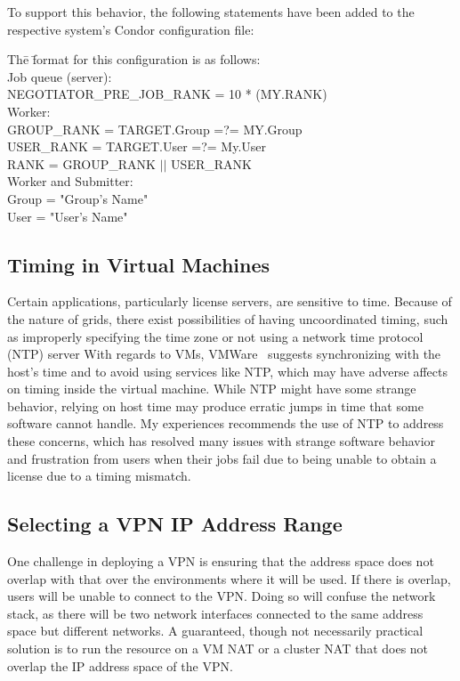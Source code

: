 To support this behavior, the following statements have been added to the
respective system's Condor configuration file:

\begin{tabbing}
Th\=e \=format for this configuration is as follows:\\
\> Job queue (server):\\
\> \> NEGOTIATOR\_PRE\_JOB\_RANK = 10 * (MY.RANK) \\
\> Worker:\\
\> \> GROUP\_RANK = TARGET.Group =?= MY.Group \\
\> \> USER\_RANK = TARGET.User =?= My.User \\
\> \> RANK = GROUP\_RANK $\vert\vert$ USER\_RANK \\
\>  Worker and Submitter:\\
\> \> Group = "Group's Name"\\
\> \> User = "User's Name"
\end{tabbing}

\subsection{Timing in Virtual Machines}

Certain applications, particularly license servers, are sensitive to time.
Because of the nature of grids, there exist possibilities of having
uncoordinated timing, such as improperly specifying the time zone or not using
a network time protocol (NTP) server With regards to VMs,
VMWare~\cite{vmware_timing} suggests synchronizing with the host's time and to
avoid using services like NTP, which may have adverse affects on timing inside
the virtual machine.  While NTP might have some strange behavior, relying on
host time may produce erratic jumps in time that some software cannot handle.
My experiences recommends the use of NTP to address these concerns, which has
resolved many issues with strange software behavior and frustration from users
when their jobs fail due to being unable to obtain a license due to a timing
mismatch.

\subsection{Selecting a VPN IP Address Range}

One challenge in deploying a VPN is ensuring that the address space does not
overlap with that over the environments where it will be used.  If there is
overlap, users will be unable to connect to the VPN.  Doing so will confuse the
network stack, as there will be two network interfaces connected to the same
address space but different networks.  A guaranteed, though not necessarily
practical solution is to run the resource on a VM NAT or a cluster NAT that
does not overlap the IP address space of the VPN.

